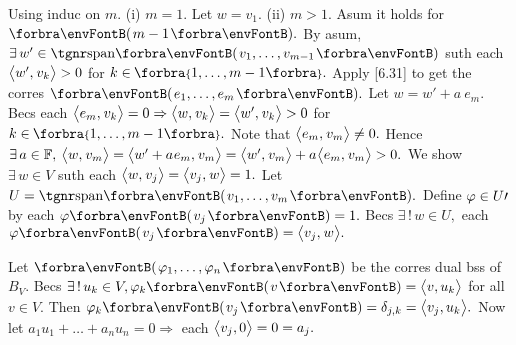 Using induc on $m.$ (i) $m=1.$ Let $w=v_1.$ (ii) $m>1.$ Asum it holds for $\Par{m-1}.$\parSol{}
By asum, $\exists\,w'\in\Span{v_1,\dots,v_{m-1}}$ suth each $\big\langle{}w',\:\!v_k{}\big\rangle>0$ for $k\in\;\!\!\Bra{1,\dots,m-1}.$\parSol{}
Apply [6.31] to get the corres $\Par{e_1,\dots,e_m}.$ \;Let $w=w'+a\:\!e_m.$\parSol{}
Becs each $\big\langle{}e_m,\:\!v_k{}\big\rangle=0\Rightarrow\big\langle{}w,\:\!v_k{}\big\rangle=\big\langle{}w',\:\!v_k{}\big\rangle>0$ for $k\in\;\!\!\Bra{1,\dots,m-1}.$\parSol{}
Note that $\big\langle{}e_m,\:\!v_m{}\big\rangle\neq0.$ Hence $\exists\,a\in{\mathbb{F}},\:\big\langle{}w,\:\!v_m{}\big\rangle=\big\langle{}w'+a\:\!e_m,\:\!v_m{}\big\rangle=\big\langle{}w',\:\!v_m{}\big\rangle+a\:\!\big\langle{}e_m,\:\!v_m{}\big\rangle>0.$\PfEnd\vspace{4pt}\parSol{}
\Or We show $\exists\,w\in V$ suth each $\big\langle{}w,\:\!v_j{}\big\rangle=\big\langle{}v_j,\:\!w{}\big\rangle=1.$ Let $U=\Span{v_1,\dots,v_m}.$\parSol{}
Define $\varphi\in U\prime$ by each $\varphi\Par{v_j}=1.$ \;Becs $\exists\,!\,w\in U,$ each $\varphi\Par{v_j}=\Ang{v_j,\:\!w}.$\PfEnd
\SepLine

Let $\Par{\varphi_1,\dots,\varphi_n}$ be the corres dual bss of $B_V.$ \;Becs $\exists\,!\,u_k\in V,\varphi_k\Par{v}=\Ang{v,u_k}$ for all $v\in V.$\parSol{}
Then $\varphi_k\Par{v_j}=\delta_{j,k}=\Ang{v_j,u_k}.$ \;Now let $a_1u_1+\dots+a_nu_n=0\Rightarrow$ each $\big\langle{}v_j,0{}\big\rangle=0=a_j.$\PfEnd
\SepLine

